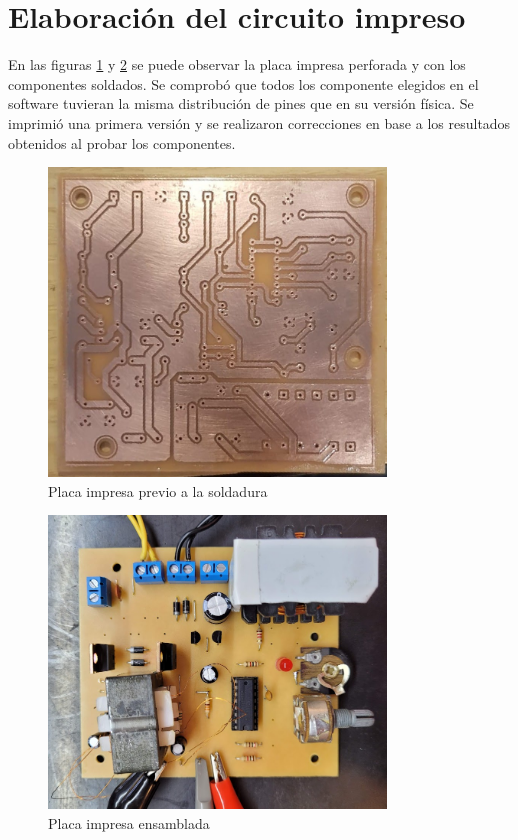 \section{Elaboración del circuito impreso}

En las figuras \ref{fig:pcb-implementada} y \ref{fig:pcb-soldada} se puede observar la placa impresa perforada y
con los componentes soldados.
Se comprobó que todos los componente elegidos en el software tuvieran la misma distribución de pines que en su versión física. 
Se imprimió una primera versión y se realizaron correcciones en base a los resultados obtenidos al probar los componentes. \cite{pcb-atei}

\begin{figure}[H]
    \centering
    \includegraphics[width=0.8\textwidth]{images/pcb-implementada.jpeg}
    \caption{Placa impresa previo a la soldadura}
    \label{fig:pcb-implementada}
\end{figure}

\begin{figure}[ht]
    \centering
    \includegraphics[width=0.8\textwidth]{images/pcb-soldada.png}
    \caption{Placa impresa ensamblada}
    \label{fig:pcb-soldada}
\end{figure}

